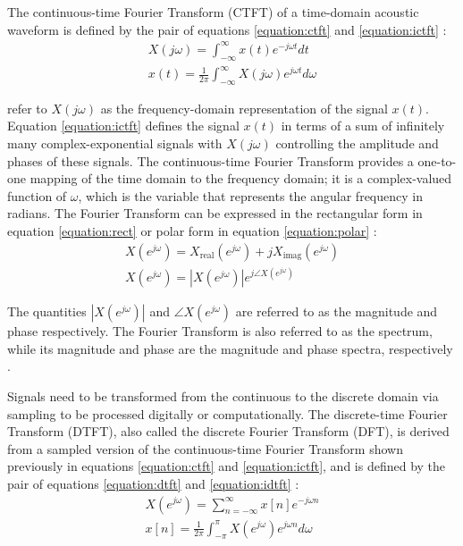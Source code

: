 \documentclass[report.tex]{subfiles}
\begin{document}
The continuous-time Fourier Transform (CTFT) of a time-domain acoustic waveform is defined by the pair of equations \eqref{equation:ctft} and \eqref{equation:ictft} \parencite[308]{dspfirst}:
\begin{align}
	X(j\omega) = \int_{-\infty}^{\infty}{x(t)e^{-j\omega t}\mathit{dt}} \tag{1}\label{equation:ctft} \\
	x(t) = \frac{1}{2\pi}\int_{-\infty}^{\infty}{X(j\omega)e^{j\omega t}\mathit{d\omega}} \tag{2}\label{equation:ictft}
\end{align}

\textcite{dspfirst} refer to $X(j\omega)$ as the frequency-domain representation of the signal $x(t)$. Equation \eqref{equation:ictft} defines the signal $x(t)$ in terms of a sum of infinitely many complex-exponential signals with $X(j\omega)$ controlling the amplitude and phases of these signals. The continuous-time Fourier Transform provides a one-to-one mapping of the time domain to the frequency domain; it is a complex-valued function of $\omega$, which is the variable that represents the angular frequency in radians. The Fourier Transform can be expressed in the rectangular form in equation \eqref{equation:rect} or polar form in equation \eqref{equation:polar} \parencite[49]{discretebook}:
\begin{align}
	X(e^{j\omega}) = X_{\text{real}}(e^{j\omega}) + j X_{\text{imag}}(e^{j\omega}) \tag{3}\label{equation:rect} \\
	X(e^{j\omega}) = |X(e^{j\omega})|e^{j\angle X(e^{j\omega})} \tag{4}\label{equation:polar}
\end{align}

The quantities $|X(e^{j\omega})|$ and $\angle X(e^{j\omega})$ are referred to as the magnitude and phase respectively. The Fourier Transform is also referred to as the spectrum, while its magnitude and phase are the magnitude and phase spectra, respectively \parencite{discretebook}.

Signals need to be transformed from the continuous to the discrete domain via sampling to be processed digitally or computationally. The discrete-time Fourier Transform (DTFT), also called the discrete Fourier Transform (DFT), is derived from a sampled version of the continuous-time Fourier Transform shown previously in equations \eqref{equation:ctft} and \eqref{equation:ictft}, and is defined by the pair of equations \eqref{equation:dtft} and \eqref{equation:idtft} \parencite[289]{melbook}:
\begin{align}
	X(e^{j\omega}) = \sum_{n = -\infty}^{\infty}{x[n]e^{-j\omega n}} \tag{5}\label{equation:dtft} \\
	x[n] = \frac{1}{2\pi}\int_{-\pi}^{\pi}{X(e^{j\omega})e^{j\omega n}\mathit{d\omega}} \tag{6}\label{equation:idtft}
\end{align}
\end{document}
